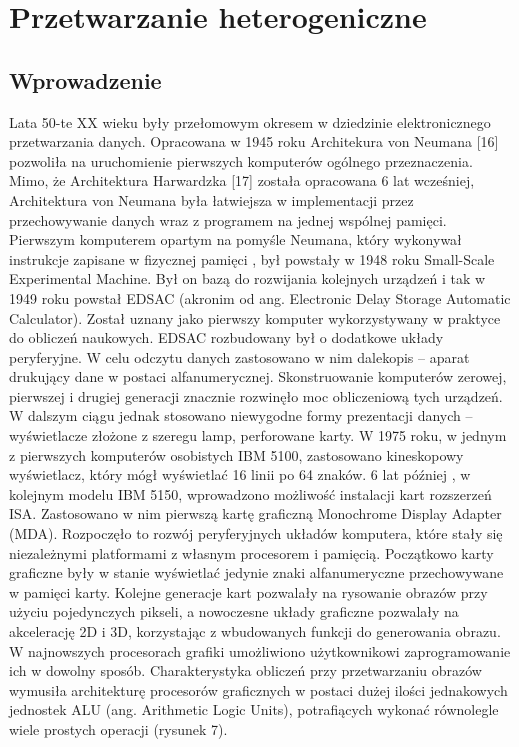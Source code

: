 \chapter{Przetwarzanie heterogeniczne}\label{cha:hpo}


\section{Wprowadzenie}\label{sec:wprowadzenie}


Lata 50-te XX wieku były przełomowym okresem w dziedzinie elektronicznego przetwarzania danych. Opracowana w 1945 roku Architekura von Neumana [16] pozwoliła na uruchomienie pierwszych komputerów ogólnego przeznaczenia. Mimo, że Architektura Harwardzka [17] została opracowana 6 lat wcześniej, Architektura von Neumana była łatwiejsza w implementacji przez przechowywanie danych wraz z programem na jednej wspólnej pamięci. Pierwszym komputerem opartym na pomyśle Neumana, który wykonywał instrukcje zapisane w fizycznej pamięci , był powstały w 1948 roku Small-Scale Experimental Machine. Był on bazą do rozwijania kolejnych urządzeń i tak w 1949 roku powstał EDSAC (akronim od ang. Electronic Delay Storage Automatic Calculator). Został uznany jako  pierwszy komputer wykorzystywany w praktyce do obliczeń naukowych. EDSAC rozbudowany był o dodatkowe układy peryferyjne. W celu odczytu danych zastosowano w nim dalekopis – aparat drukujący dane w postaci alfanumerycznej. Skonstruowanie komputerów zerowej, pierwszej i drugiej generacji znacznie rozwinęło moc obliczeniową tych urządzeń. W dalszym ciągu jednak stosowano niewygodne formy prezentacji danych – wyświetlacze złożone z szeregu lamp, perforowane karty. W 1975 roku, w jednym z pierwszych komputerów osobistych IBM 5100, zastosowano kineskopowy wyświetlacz, który mógł wyświetlać 16 linii po 64 znaków. 6 lat później , w kolejnym modelu IBM 5150, wprowadzono możliwość instalacji kart rozszerzeń ISA. Zastosowano w nim pierwszą kartę graficzną Monochrome Display Adapter (MDA). Rozpoczęło to rozwój peryferyjnych układów komputera, które stały się niezależnymi platformami z własnym procesorem i pamięcią. Początkowo karty graficzne były w stanie wyświetlać jedynie znaki alfanumeryczne przechowywane w pamięci karty. Kolejne generacje kart pozwalały na rysowanie obrazów przy użyciu pojedynczych pikseli, a nowoczesne układy graficzne pozwalały na akcelerację 2D i 3D, korzystając z wbudowanych funkcji do generowania obrazu. W najnowszych procesorach grafiki umożliwiono użytkownikowi zaprogramowanie ich w dowolny sposób. Charakterystyka obliczeń przy przetwarzaniu obrazów wymusiła architekturę procesorów graficznych w postaci dużej ilości jednakowych jednostek ALU (ang. Arithmetic Logic Units), potrafiących wykonać równolegle wiele prostych operacji (rysunek 7).

